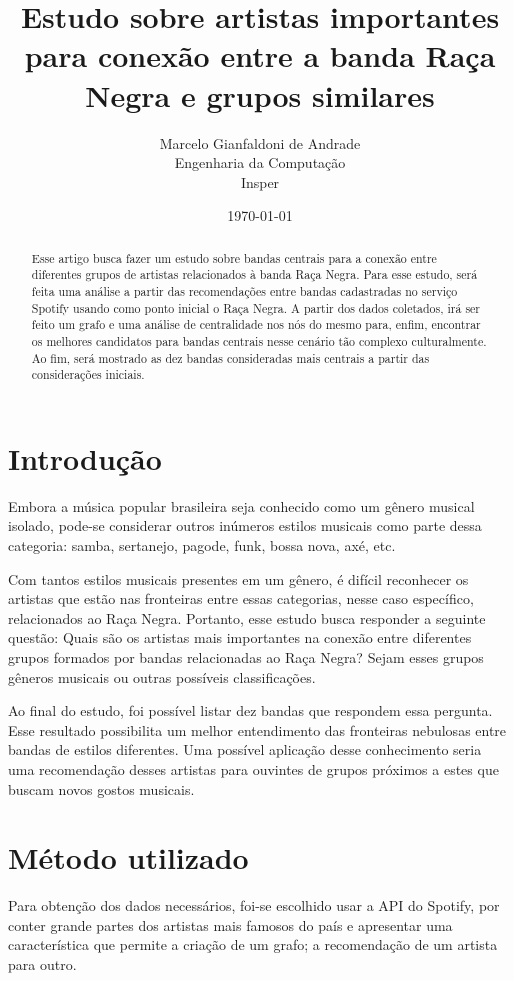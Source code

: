 \documentclass[12pt]{article}
\title{Estudo sobre artistas importantes para conexão entre a banda Raça Negra e grupos similares}
\author{
	Marcelo Gianfaldoni de Andrade\\
	Engenharia da Computação\\
	Insper\\
}
\date{\today}
\begin{document}
\maketitle

\newpage
\tableofcontents
\newpage

\begin{abstract}
Esse artigo busca fazer um estudo sobre bandas centrais para a conexão entre diferentes grupos de artistas relacionados à banda Raça Negra. Para esse estudo, será feita uma análise a partir das recomendações entre bandas cadastradas no serviço Spotify usando como ponto inicial o Raça Negra. A partir dos dados coletados, irá ser feito um grafo e uma análise de centralidade nos nós do mesmo para, enfim, encontrar os melhores candidatos para bandas centrais nesse cenário tão complexo culturalmente. Ao fim, será mostrado as dez bandas consideradas mais centrais a partir das considerações iniciais.
\end{abstract}

\section{Introdução}
Embora a música popular brasileira seja conhecido como um gênero musical isolado, pode-se considerar outros inúmeros estilos musicais como parte dessa categoria: samba, sertanejo, pagode, funk, bossa nova, axé, etc.

Com tantos estilos musicais presentes em um gênero, é difícil reconhecer os artistas que estão nas fronteiras entre essas categorias, nesse caso específico, relacionados ao Raça Negra. Portanto, esse estudo busca responder a seguinte questão: Quais são os artistas mais importantes na conexão entre diferentes grupos formados por bandas relacionadas ao Raça Negra? Sejam esses grupos gêneros musicais ou outras possíveis classificações.

Ao final do estudo, foi possível listar dez bandas que respondem essa pergunta. Esse resultado possibilita um melhor entendimento das fronteiras nebulosas entre bandas de estilos diferentes. Uma possível aplicação desse conhecimento seria uma recomendação desses artistas para ouvintes de grupos próximos a estes que buscam novos gostos musicais. 

\section{Método utilizado}
Para obtenção dos dados necessários, foi-se escolhido usar a API do Spotify, por conter grande partes dos artistas mais famosos do país e apresentar uma característica que permite a criação de um grafo; a recomendação de um artista para outro.
\end{document}
